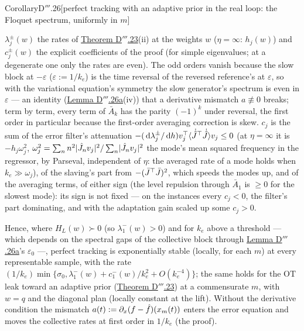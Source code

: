 \begin{thm}{Corollary}{D$'''$.26}[perfect tracking with an adaptive prior in the real loop: the Floquet spectrum,
uniformly in $m$]
\begin{enumerate}[label=\textup{(\alph*)}]
\[    \]
    $\lambda_j^\pm(w)$ the rates of \hyperref[res:thmDppp:23]{Theorem D$'''$.23}(ii) at the weights $w$
    ($\eta = \infty$: $h_j(w)$) and $c_j^\pm(w)$ the explicit coefficients of the proof (for simple eigenvalues; at a
    degenerate one only the rates are even). The odd orders vanish because the slow block at $-\varepsilon$ ($\varepsilon := 1/k_e$) is the
    time reversal of the reversed reference's at $\varepsilon$, so with the variational equation's symmetry the slow
    generator's spectrum is even in $\varepsilon$ --- an identity (\hyperref[res:thmDppp:26a]{Lemma D$'''$.26a}(iv))
    that a derivative mismatch $a\not\equiv0$ breaks; term by term, every term of $\bar A_k$ has the parity
    $(-1)^k$ under reversal, the first order in particular because the first-order averaging correction is skew.
    $c_j$ is the sum of the error filter's attenuation
    $-(\,\mathrm{d}\lambda_j^\pm/\,\mathrm{d} h)v_j^\top\langle\dot{\hat J}^\top\dot{\hat J}\rangle v_j\le0$ (at $\eta = \infty$ it is
    $-h_j\omega_j^2$, $\omega_j^2 = \sum_nn^2\lvert \hat J_nv_j\rvert^2/\sum_n\lvert \hat J_nv_j\rvert^2$ the mode's mean squared
    frequency in the regressor, by Parseval, independent of $\eta$: the averaged rate of a mode holds when
    $k_e\gg\omega_j$), of the slaving's part from $-(\bar J^\top\bar J)^2$, which speeds the modes up, and of the
    averaging terms, of either sign (the level repulsion through $\bar A_1$ is $\ge0$ for the slowest mode): its sign
    is not fixed --- on the instances every $c_j < 0$, the filter's part dominating, and with the adaptation gain
    scaled up some $c_j > 0$.
\end{enumerate}
Hence, where $H_L(w)\succ0$ (so $\lambda_1^-(w) > 0$) and for $k_e$ above a threshold --- which depends on the
spectral gaps of the collective block through \hyperref[res:thmDppp:26a]{Lemma D$'''$.26a}'s $\varepsilon_0$ ---,
perfect tracking is exponentially stable (locally, for each $m$) at every representable sample, with the rate
$(1/k_e)\min\{\sigma_0,\lambda_1^-(w) + c_1^-(w)/k_e^2 + O(k_e^{-4})\}$; the same
holds for the OT leak toward an adaptive prior (\hyperref[res:thmDppp:23]{Theorem D$'''$.23}) at a commensurate $m$,
with $w = q$ and the diagonal plan (locally constant at the lift). Without the derivative condition the mismatch
$a(t) := \partial_x(f - \hat f)(x_m(t))$ enters the error equation and moves the collective rates at first order in
$1/k_e$ (the proof).
\end{thm}

